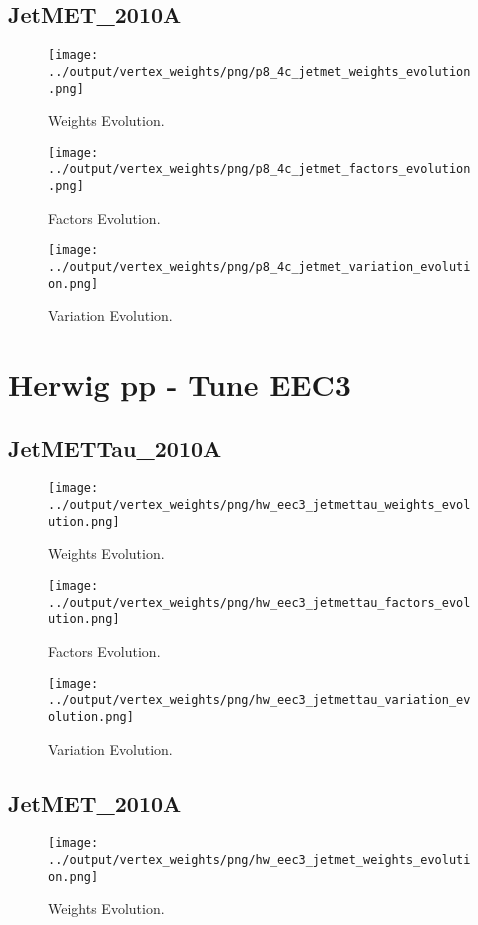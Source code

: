 \documentclass[11pt]{book}
\begin{document}
\subsection{JetMET\_2010A}
\begin{figure}[ht]
\centering
\texttt{[image: ../output/vertex\_weights/png/p8\_4c\_jetmet\_weights\_evolution.png]}
\caption{Weights Evolution.}
\end{figure}

\begin{figure}[ht]
\centering
\texttt{[image: ../output/vertex\_weights/png/p8\_4c\_jetmet\_factors\_evolution.png]}
\caption{Factors Evolution.}
\end{figure}

\begin{figure}[ht]
\centering
\texttt{[image: ../output/vertex\_weights/png/p8\_4c\_jetmet\_variation\_evolution.png]}
\caption{Variation Evolution.}
\end{figure}
\clearpage



\section{Herwig pp - Tune EEC3}
\subsection{JetMETTau\_2010A}
\begin{figure}[ht]
\centering
\texttt{[image: ../output/vertex\_weights/png/hw\_eec3\_jetmettau\_weights\_evolution.png]}
\caption{Weights Evolution.}
\end{figure}

\begin{figure}[ht]
\centering
\texttt{[image: ../output/vertex\_weights/png/hw\_eec3\_jetmettau\_factors\_evolution.png]}
\caption{Factors Evolution.}
\end{figure}

\begin{figure}[ht]
\centering
\texttt{[image: ../output/vertex\_weights/png/hw\_eec3\_jetmettau\_variation\_evolution.png]}
\caption{Variation Evolution.}
\end{figure}
\clearpage


\subsection{JetMET\_2010A}
\begin{figure}[ht]
\centering
\texttt{[image: ../output/vertex\_weights/png/hw\_eec3\_jetmet\_weights\_evolution.png]}
\caption{Weights Evolution.}
\end{figure}
\end{document}
